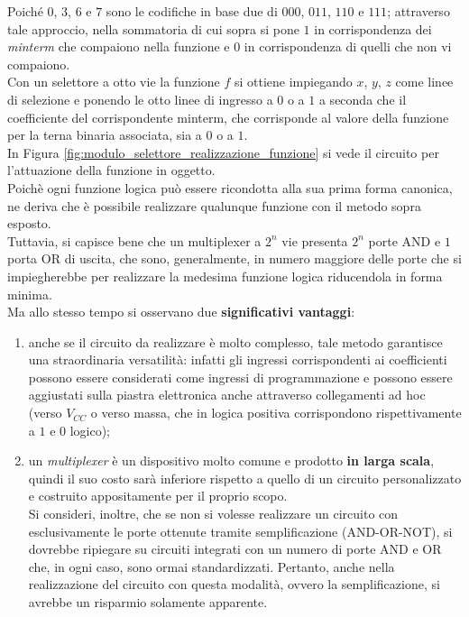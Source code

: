\documentclass[a4paper]{extarticle}
\begin{document}
\noindent
Poiché $0$, $3$, $6$ e $7$ sono le codifiche in base due di $000$, $011$, $110$ e $111$; attraverso tale approccio, nella sommatoria di cui sopra si pone $1$ in corrispondenza dei \emph{minterm} che compaiono nella funzione e $0$ in corrispondenza di quelli che non vi compaiono.\\
Con un selettore a otto vie la funzione $f$ si ottiene impiegando $x$, $y$, $z$ come linee di selezione e ponendo le otto linee di ingresso a $0$ o a $1$ a seconda che il coefficiente del corrispondente minterm, che corrisponde al valore della funzione per la terna binaria associata, sia a $0$ o a $1$.\\
In Figura \ref{fig:modulo_selettore_realizzazione_funzione} si vede il circuito per l’attuazione della funzione in oggetto.\\
Poichè ogni funzione logica può essere ricondotta alla sua prima forma canonica, ne deriva che è possibile realizzare qualunque funzione con il metodo sopra esposto.\\
Tuttavia, si capisce bene che un multiplexer a \(2^n\) vie presenta \(2^n\) porte AND e \(1\) porta OR di uscita, che sono, generalmente, in numero maggiore delle porte che si impiegherebbe per realizzare la medesima funzione logica riducendola in forma minima.\\
Ma allo stesso tempo si osservano due \textbf{significativi vantaggi}:
\begin{enumerate}
    \item anche se il circuito da realizzare è molto complesso, tale metodo garantisce una straordinaria versatilità: infatti gli ingressi corrispondenti ai coefficienti possono essere considerati come ingressi di programmazione e possono essere aggiustati sulla piastra elettronica anche attraverso collegamenti ad hoc (verso $V_{CC}$ o verso massa, che in logica positiva corrispondono rispettivamente a $1$ e $0$ logico);

    \item un \emph{multiplexer} è un dispositivo molto comune e prodotto \textbf{in larga scala}, quindi il suo costo sarà inferiore rispetto a quello di un circuito personalizzato e costruito appositamente per il proprio scopo.\\
    Si consideri, inoltre, che se non si volesse realizzare un circuito con esclusivamente le porte ottenute tramite semplificazione (AND-OR-NOT), si dovrebbe ripiegare su circuiti integrati con un numero di porte AND e OR che, in ogni caso, sono ormai standardizzati. Pertanto, anche nella realizzazione del circuito con questa modalità, ovvero la semplificazione, si avrebbe un risparmio solamente apparente.
\end{enumerate}
\end{document}

